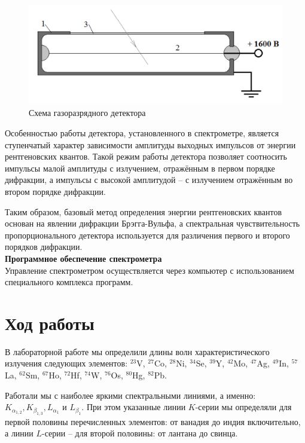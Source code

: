 \documentclass[a4paper, 12pt]{article}%
\begin{document}
		\begin{figure}[h!]
			\centering
			\includegraphics[scale=0.5]{Схема_детектора.png}
			\caption{Схема газоразрядного детектора}
		\end{figure}					
				
		Особенностью работы детектора,  установленного в спектрометре,  является ступенчатый характер зависимости амплитуды выходных импульсов от энергии рентгеновских квантов.  Такой режим работы детектора позволяет соотносить импульсы малой амплитуды с излучением,  отражённым в первом порядке дифракции,  а импульсы с высокой амплитудой – с излучением отражённым во втором порядке дифракции. 	

		Таким образом,  базовый метод определения энергии рентгеновских квантов основан на явлении дифракции Брэгга-Вульфа,  а спектральная чувствительность пропорционального детектора используется для различения первого и второго порядков дифракции.\\
			
		\textbf{Программное обеспечение спектрометра}\\
			
		Управление спектрометром осуществляется через компьютер с использованием специального комплекса программ.
					
    \section*{Ход работы}

		В лабораторной работе мы определили длины волн характеристического излучения следующих элементов: $^{23}$V,  $^{27}$Co,  $^{28}$Ni,  $^{34}$Se, $^{39}$Y,  $^{42}$Mo,  $^{47}$Ag,  $^{49}$In,  $^{57}$La,  $^{62}$Sm,  $^{67}$Ho, $^{72}$Hf,  $^{74}$W,  $^{76}$Os,  $^{80}$Hg,  $^{82}$Pb.

		Работали мы с наиболее яркими спектральными линиями,  а именно: $K_{\alpha_{1, 2}},  K_{\beta_{1, 3}},  L_{\alpha_1}$ и $L_{\beta_1}$.  При этом указанные линии $K$-серии мы определяли для первой половины перечисленных элементов: от ванадия до индия включительно,  а линии $L$-серии -- для второй половины: от лантана до свинца.
\end{document}
